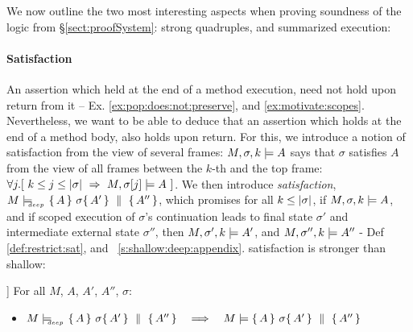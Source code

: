 

We now outline the two most interesting aspects when proving soundness of the logic from \S \ref{sect:proofSystem}: strong quadruples, and summarized execution:

 
\paragraph{\Strong Satisfaction} 
\label{s:scoped:valid}


An assertion which held at the end of a method execution, need not hold upon return from it -- \cf Ex. \ref{ex:pop:does:not:preserve}, and   \ref{ex:motivate:scopes}. 
Nevertheless, we want to be able to deduce that an assertion which holds at the end of a method body, also holds upon return. For this, we introduce a notion of satisfaction from the view of several frames: %
 $ M,\sigma ,{k} \models {A} $   says that $\sigma$ satisfies $A$ from the view  of all frames between the $k$-th  and the top frame:
\ie $\forall j. [\  k\leq j \leq \DepthSt \sigma \ \Rightarrow \ M, \RestictTo \sigma j \models A \ ]$.
We then introduce \emph{\strong satisfaction},  $M \models\!\!\!\!_{_{deep}}\   \{\, A \, \}\ \sigma \{\, A' \, \} \, \,\parallel\,\, \{\, A'' \, \} $, which promises for all $k\leq |\sigma|$,  
if $ M,\sigma ,{k} \models {A} $, and if  scoped execution of $\sigma$'s continuation leads to final state $\sigma'$ and intermediate external state $\sigma''$, then
 $ M,\sigma' ,{k} \models {A'} $, and  $ M,\sigma'' ,{k} \models {A''} $
 - \cf Def \ref{def:restrict:sat}, and  \A\ \ref{s:shallow:deep:appendix}.
\Strong satisfaction is stronger than shallow:   
 
\begin{lemma}]
For all $M$, $A$, $A'$, $A''$, $\sigma$:  
\begin{itemize}
\item
 $M \models\!\!\!\!_{_{deep}}\   \{\, A \, \}\ \sigma \{\, A' \, \} \, \,\parallel\,\, \{\, A'' \, \}    \ \ \ \Longrightarrow \ \ \   M \models  \{\, A \, \}\ \sigma \{\, A' \, \} \, \,\parallel\,\, \{\, A'' \, \} $


\end{itemize}
\end{lemma}

